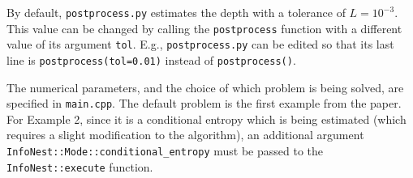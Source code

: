 \documentclass[entropy,article,accept,oneauthor,pdftex,10pt,a4paper]{mdpi}
\begin{document}
By default, {\tt postprocess.py} estimates the depth with a tolerance of
$L=10^{-3}$. This value can be changed by calling the {\tt postprocess}
function with a different value of its argument {\tt tol}. E.g.,
{\tt postprocess.py} can be edited so that its last line is
{\tt postprocess(tol=0.01)} instead of {\tt postprocess()}.

The numerical parameters, and the choice of which problem is being solved,
are specified in {\tt main.cpp}. The default problem is the first example
from the paper. For Example 2, since it is a conditional entropy which is
being estimated (which requires a slight modification to the algorithm),
an additional argument {\tt InfoNest::Mode::conditional\_entropy}
must be passed to the {\tt InfoNest::execute} function.


%

\end{document}
